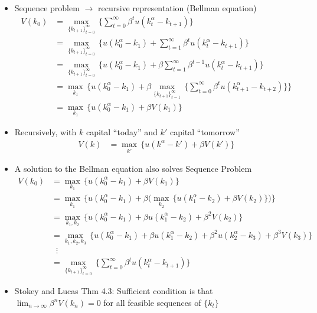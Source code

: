 \documentclass[10pt]{beamer}
\begin{document}
\begin{frame}{}
\begin{itemize}
\item Sequence problem $\longrightarrow$ recursive representation (Bellman equation)
\begin{align*}
	V(k_0) &= \max_{ \{ k_{t+1} \}_{t=0}^\infty } \, \bigg\{  \sum_{t = 0}^\infty \beta^t u(k_t^\alpha  - k_{t+1}) \bigg\} \\
	&= \max_{ \{ k_{t+1} \}_{t=0}^\infty } \, \bigg\{ u(k_0^\alpha  - k_1) + \sum_{t = 1}^\infty \beta^t u(k_t^\alpha  - k_{t+1}) \bigg\}  \\
	&= \max_{ \{ k_{t+1} \}_{t=0}^\infty } \, \bigg\{ u(k_0^\alpha  - k_1) + \beta \sum_{t = 1}^\infty \beta^{t-1} u(k_t^\alpha  - k_{t+1}) \bigg\} \\
	&= \max_{k_1} \, \bigg\{ u(k_0^\alpha  - k_1) + \beta \max_{ \{ k_{t+1} \}_{t=1}^\infty } \, \bigg\{  \sum_{t = 0}^\infty \beta^t u(k_{t+1}^\alpha  - k_{t+2}) \bigg\} \bigg\} \\
	&= \max_{ k_1} \, \bigg\{ u(k_0^\alpha  - k_1) + \beta V(k_1) \bigg\}
\end{align*}

\item Recursively, with $k$ capital ``today'' and $k'$ capital ``tomorrow''
\begin{align*}
	V(k) &= \max_{k'} \, \bigg\{ u(k^\alpha  - k') + \beta V(k') \bigg\}
\end{align*}

\end{itemize}
\end{frame}


\begin{frame}{}
\begin{itemize}
\item A solution to the Bellman equation also solves Sequence Problem
\begin{align*}
	V(k_0) &= \max_{ k_1} \, \bigg\{ u(k_0^\alpha  - k_1) + \beta V(k_1) \bigg\} \\
	&= \max_{ k_1} \, \bigg\{ u(k_0^\alpha  - k_1) + \beta \bigg( \max_{ k_2} \, \bigg\{ u(k_1^\alpha  - k_2) + \beta V(k_2) \bigg\} \bigg) \bigg\} \\
	&= \max_{ k_1, k_2} \, \bigg\{ u(k_0^\alpha  - k_1) + \beta u(k_1^\alpha  - k_2) + \beta^2 V(k_2) \bigg\} \\
	&= \max_{ k_1, k_2, k_3} \, \bigg\{ u(k_0^\alpha  - k_1) + \beta u(k_1^\alpha  - k_2) + \beta^2 u(k_2^\alpha  - k_3) + \beta^3 V(k_3) \bigg\} \\
	&\;\; \vdots \\
	&= \max_{ \{ k_{t+1} \}_{t=0}^\infty } \, \bigg\{  \sum_{t = 0}^\infty \beta^t u(k_t^\alpha  - k_{t+1}) \bigg\} 
\end{align*}

\item Stokey and Lucas Thm 4.3: Sufficient condition is that $\lim_{n \to \infty} \beta^n V(k_n) = 0$ for all feasible sequences of $\{ k_t \}$ 

\end{itemize}
\end{frame}
\end{document}
